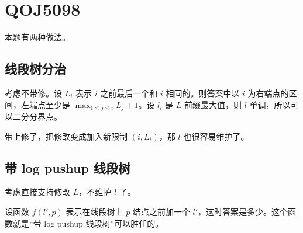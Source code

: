 \documentclass{noithesis}
\begin{document}
\section{QOJ5098}

本题有两种做法。

\subsection{线段树分治}

考虑不带修。设 $L_i$ 表示 $i$ 之前最后一个和 $i$ 相同的。则答案中以 $i$ 为右端点的区间，左端点至少是 $\max_{1\le j\le i}L_j+1$。设 $l_i$ 是 $L$ 前缀最大值，则 $l$ 单调，所以可以二分分界点。

带上修了，把修改变成加入新限制 $(i,L_i)$，那 $l$ 也很容易维护了。

\subsection{带 log pushup 线段树}

考虑直接支持修改 $L$，不维护 $l$ 了。

设函数 $f(l',p)$ 表示在线段树上 $p$ 结点之前加一个 $l'$，这时答案是多少。这个函数就是“带 log pushup 线段树”可以胜任的。
\end{document}
